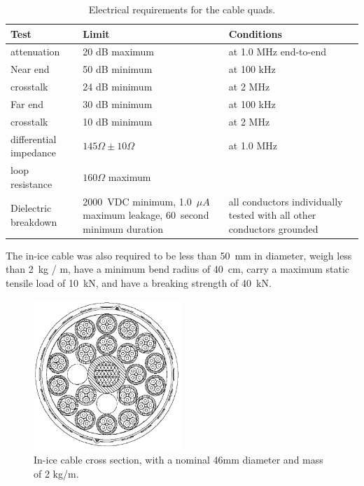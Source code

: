 \begin{table}[h]
  \centering
  \begin{tabularx}{\textwidth}{| l | X | X | }
    \hline
    \bf{Test} & \bf{Limit} & \bf{Conditions} \\
    \hline

    attenuation & 20 dB maximum & at 1.0 MHz end-to-end \\
    \hline
%

   Near end & 50 dB minimum & at 100 kHz \\
    \cline {2-3}
    \cline {2-3}
   crosstalk & 24 dB minimum & at 2 MHz \\
    \hline

    Far end & 30 dB minimum & at 100 kHz\\
    \cline {2-3}
    \cline {2-3}
    crosstalk& 10 dB minimum & at 2 MHz \\
    \hline

    differential impedance & $145\Omega \pm 10\Omega$ & at 1.0 MHz \\
    \hline

    loop resistance & $160\Omega$ maximum & \\
    \hline

    Dielectric breakdown & 2000~VDC minimum, 1.0~$\mu A$ maximum leakage, 60~second
    minimum duration & all conductors individually tested with all other
    conductors grounded \\
    \hline    
  \end{tabularx}
  \caption{Electrical requirements for the cable quads.} 
  \label{tab:quad_requirements}
\end{table}

 The in-ice cable was also required to be less than 50~mm in
 diameter, weigh less than 2~kg / m, have a minimum bend radius of 40~cm,
 carry a maximum static tensile load of 10~kN, and have a breaking strength
 of 40~kN.
 
\begin{figure}
  \centering
  \includegraphics[width=0.5\textwidth]{graphics/cables/cable_xsection.png}
  \caption{\label{fig:cable_xsection}In-ice cable cross
    section, with a nominal 46mm diameter and mass of 2 kg/m.} 
\end{figure}


